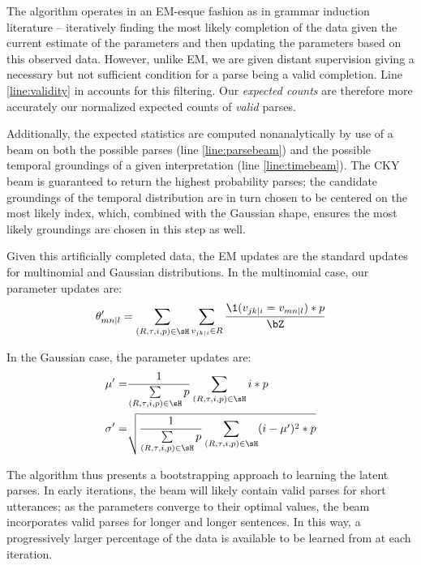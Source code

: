 The algorithm operates in an EM-esque fashion as in grammar induction
	literature \needcite -- iteratively finding the most
	likely completion of the data given the current estimate of the parameters
	and then updating the parameters based on this observed data.
However, unlike EM, we are given distant supervision giving a necessary but
	not sufficient condition for a parse being a valid completion.
Line \ref{line:validity} in  accounts for this filtering.
Our \textit{expected counts} are therefore more accurately our normalized
	expected counts of \textit{valid} parses.

Additionally, the expected statistics are computed nonanalytically by use of
	a beam on both the possible parses (line \ref{line:parsebeam}) and the
	possible temporal groundings of a given interpretation (line
	\ref{line:timebeam}).
The CKY beam is guaranteed to return the highest probability parses;
	the candidate groundings of the temporal distribution are in turn chosen
	to be centered on the most likely index, which, combined with the Gaussian
	shape, ensures the most likely groundings are chosen in this step as well.

Given this artificially completed data, the EM updates are the standard
	updates for multinomial and Gaussian distributions.
In the multinomial case, our parameter updates are:
\begin{equation}
	\theta_{mn \mid l}' =
		\sum\limits_{(R,\tau,i,p) \in \sH} \sum\limits_{v_{jk \mid i} \in R}
		\frac{
			\1(v_{jk \mid i} = v_{mn \mid l}) * p
		}{
			\bZ
		}
\label{eqn:multinomialEM}
\end{equation}

In the Gaussian case, the parameter updates are:
\begin{align}
	\mu' =&
		\frac{ 1 } { \sum\limits_{(R,\tau,i,p) \in \sH}  p }
		\sum\limits_{(R,\tau,i,p) \in \sH} i * p \\
	\sigma' =& \sqrt{
		\frac{ 1 } { \sum\limits_{(R,\tau,i,p) \in \sH}  p }
		\sum\limits_{(R,\tau,i,p) \in \sH} (i-\mu')^2 * p
	}
\label{eqn:multinomialEM}
\end{align}

The algorithm thus presents a bootstrapping approach to learning the latent
	parses.
In early iterations, the beam will likely contain valid parses for short
	utterances;
	as the parameters converge to their optimal values, the beam incorporates
	valid parses for longer and longer sentences.
In this way, a progressively larger percentage of the data is available to be
	learned from at each iteration.

